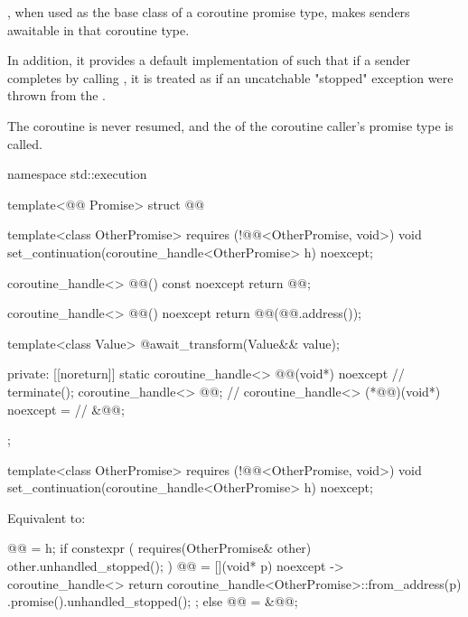 \pnum
{},
when used as the base class of a coroutine promise type,
makes senders awaitable in that coroutine type.

In addition, it provides a default implementation of 
such that if a sender completes by calling ,
it is treated as if an uncatchable "stopped" exception were thrown
from the .
\begin{note}
The coroutine is never resumed, and
the  of the coroutine caller's promise type is called.
\end{note}

\begin{codeblock}
namespace std::execution {
  template<@@ Promise>
    struct @@ {
      template<class OtherPromise>
        requires (!@@<OtherPromise, void>)
      void set_continuation(coroutine_handle<OtherPromise> h) noexcept;

      coroutine_handle<> @@() const noexcept { return @@; }

      coroutine_handle<> @@() noexcept {
        return @@(@@.address());
      }

      template<class Value>
      @\seebelow@ await_transform(Value&& value);

    private:
      [[noreturn]] static coroutine_handle<>
        @@(void*) noexcept {             // \expos
        terminate();
      }
      coroutine_handle<> @@{};                        // \expos
      coroutine_handle<> (*@@)(void*) noexcept =   // \expos
        &@@;
    };
}
\end{codeblock}

%
\begin{itemdecl}
template<class OtherPromise>
  requires (!@@<OtherPromise, void>)
void set_continuation(coroutine_handle<OtherPromise> h) noexcept;
\end{itemdecl}

\begin{itemdescr}
\pnum
\effects
Equivalent to:
\begin{codeblock}
@@ = h;
if constexpr ( requires(OtherPromise& other) { other.unhandled_stopped(); } ) {
  @@ = [](void* p) noexcept -> coroutine_handle<> {
    return coroutine_handle<OtherPromise>::from_address(p)
      .promise().unhandled_stopped();
  };
} else {
  @@ = &@@;
}
\end{codeblock}
\end{itemdescr}

